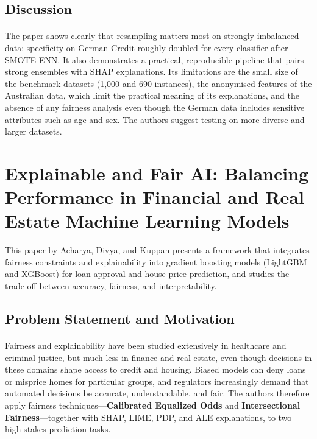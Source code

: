 \documentclass[12pt,a4paper,final]{extreport}
\begin{document}
\subsection{Discussion}

\paragraph{} The paper shows clearly that resampling matters most on strongly imbalanced data: specificity on German Credit roughly doubled for every classifier after SMOTE-ENN. It also demonstrates a practical, reproducible pipeline that pairs strong ensembles with SHAP explanations. Its limitations are the small size of the benchmark datasets (1{,}000 and 690 instances), the anonymised features of the Australian data, which limit the practical meaning of its explanations, and the absence of any fairness analysis even though the German data includes sensitive attributes such as age and sex. The authors suggest testing on more diverse and larger datasets.

\section{Explainable and Fair AI: Balancing Performance in Financial and Real Estate Machine Learning Models}

This paper by Acharya, Divya, and Kuppan \cite{p4} presents a framework that integrates fairness constraints and explainability into gradient boosting models (LightGBM and XGBoost) for loan approval and house price prediction, and studies the trade-off between accuracy, fairness, and interpretability.

\subsection{Problem Statement and Motivation}

\paragraph{} Fairness and explainability have been studied extensively in healthcare and criminal justice, but much less in finance and real estate, even though decisions in these domains shape access to credit and housing. Biased models can deny loans or misprice homes for particular groups, and regulators increasingly demand that automated decisions be accurate, understandable, and fair. The authors therefore apply fairness techniques---\textbf{Calibrated Equalized Odds} and \textbf{Intersectional Fairness}---together with SHAP, LIME, PDP, and ALE explanations, to two high-stakes prediction tasks.
\end{document}
